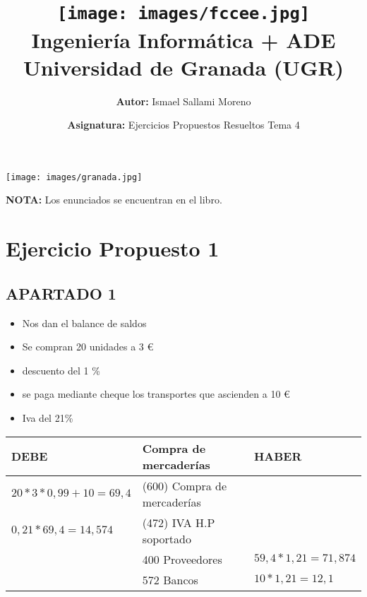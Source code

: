\documentclass[a4paper,12pt]{article}
\title{
    \vspace{-2cm}
    \texttt{[image: images/fccee.jpg]} \\ %
    \LARGE Ingeniería Informática + ADE\\
    \large Universidad de Granada (UGR)\\[1cm]
}
\author{\textbf{Autor:} Ismael Sallami Moreno}
\date{\textbf{Asignatura:} Ejercicios Propuestos Resueltos Tema 4}
\begin{document}
\maketitle
\thispagestyle{empty}

\begin{center}
    \texttt{[image: images/granada.jpg]} \\ %
    \vfill
\end{center}

\newpage

\tableofcontents
\newpage

\textbf{NOTA:} Los enunciados se encuentran en el libro.

\section{Ejercicio Propuesto 1}
\subsection*{APARTADO 1}
\begin{itemize}
    \item Nos dan el balance de saldos
    \item Se compran 20 unidades a 3 \euro
    \item descuento del 1 \%
    \item se paga mediante cheque los transportes que ascienden a 10 \euro
    \item Iva del 21\%
\end{itemize}

\begin{table}[H]
    \centering
    \begin{tabular}{|p{3cm}|p{6cm}|p{3cm}|}
    \hline
    \textbf{DEBE} & \textbf{Compra de mercaderías} & \textbf{HABER} \\
    \hline
    $20 * 3* 0,99 + 10 = 69,4 $& (600) Compra de mercaderías & \\
    \hline
    $0,21*69,4 = 14,574$& (472) IVA H.P soportado & \\
    \hline
    & 400 Proveedores & $59,4 * 1,21 = 71,874$\\
    \hline
    & 572 Bancos &$10 * 1,21 = 12,1$ \\
    \hline
    \end{tabular}
    \end{table}
\end{document}

